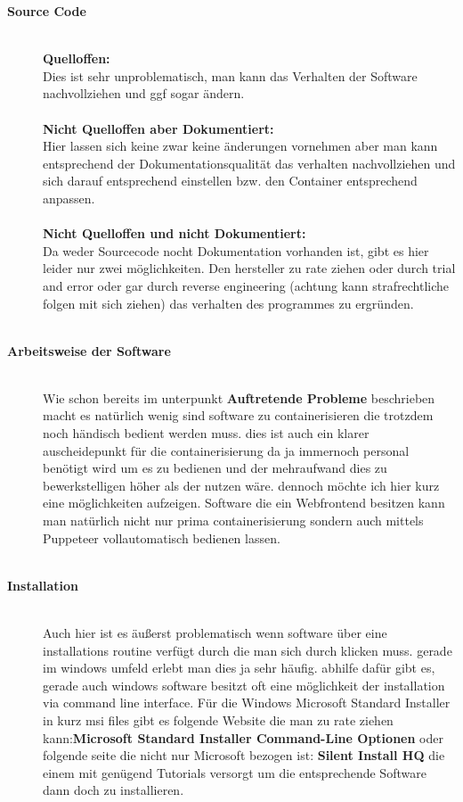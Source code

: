 \begin{description}
	\item[\textbf{Source Code}]\hfill \\


	\textbf{Quelloffen:}\\ Dies ist sehr unproblematisch, man kann das Verhalten der Software nachvollziehen und ggf sogar ändern. \\  \\
	\textbf{Nicht Quelloffen aber Dokumentiert:}\\ Hier lassen sich keine zwar keine änderungen vornehmen aber man kann entsprechend der Dokumentationsqualität das verhalten nachvollziehen und sich darauf entsprechend einstellen bzw. den Container entsprechend anpassen. \\ \\
	\textbf{Nicht Quelloffen und nicht Dokumentiert:}\\ Da weder Sourcecode nocht Dokumentation vorhanden ist, gibt es hier leider nur zwei möglichkeiten. Den hersteller zu rate ziehen oder durch trial and error oder gar durch reverse engineering \cite{eilam2011reversing} (achtung kann strafrechtliche folgen mit sich ziehen) das verhalten des programmes zu ergründen. \\ \\
	\item[\textbf{Arbeitsweise der Software}]\hfill \\ Wie schon bereits im unterpunkt \textbf{Auftretende Probleme} beschrieben macht es natürlich wenig sind software zu containerisieren die trotzdem noch händisch bedient werden muss. dies ist auch ein klarer auscheidepunkt für die containerisierung da ja immernoch personal benötigt wird um es zu bedienen und der mehraufwand dies zu bewerkstelligen höher als der nutzen wäre. dennoch möchte ich hier kurz eine möglichkeiten aufzeigen. Software die ein Webfrontend besitzen kann man natürlich nicht nur prima containerisierung sondern auch mittels Puppeteer \cite{puppeteer} vollautomatisch bedienen lassen. \\ \\
	\item[\textbf{Installation}]\hfill \\ Auch hier ist es äußerst problematisch wenn software über eine installations routine verfügt durch die man sich durch klicken muss. gerade im windows umfeld erlebt man dies ja sehr häufig. abhilfe dafür gibt es, gerade auch windows software besitzt oft eine möglichkeit der installation via command line interface. Für die Windows Microsoft Standard Installer in kurz msi files gibt es folgende Website die man zu rate ziehen kann:\textbf{Microsoft Standard Installer Command-Line Optionen} \cite{microsoft} oder folgende seite die nicht nur Microsoft bezogen ist: \textbf{Silent Install HQ} \cite{Silent}  die einem mit genügend Tutorials versorgt um die entsprechende Software dann doch zu installieren.\\ \\

\end{description}
